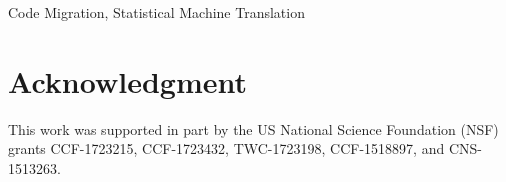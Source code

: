 \documentclass[10pt,conference]{IEEEtran}
\begin{document}
\maketitle



\begin{IEEEkeywords}
Code Migration, Statistical Machine Translation
\end{IEEEkeywords}












\section*{Acknowledgment}
This work was supported in part by the US National Science
Foundation (NSF) grants CCF-1723215, CCF-1723432, TWC-1723198,
CCF-1518897, and CNS-1513263.



\newpage

\balance
%








\end{document}
